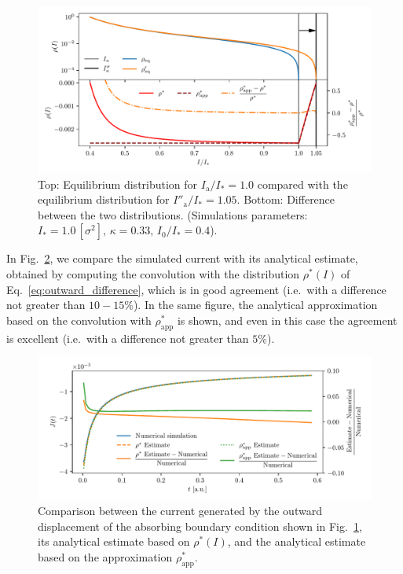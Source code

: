 {\begin{figure}[htp]
    \centering
    \includegraphics[width=\textwidth]{4_probing_the_diffusive_behavior/figs/final/difference_outwards_s.pdf}
    \caption{Top: Equilibrium distribution for $I_\mathrm{a}/I_\ast = 1.0$ compared with the equilibrium distribution for $I''_\mathrm{a}/I_\ast = 1.05$. Bottom: Difference between the two distributions. (Simulations parameters: $I_\ast = 1.0\,[\sigma^2],\, \kappa = 0.33,\, I_0/I_\ast = 0.4$).}
    \label{fig:6}
\end{figure}

In Fig.~\ref{fig:7}, we compare the simulated current with its analytical estimate, obtained by computing the convolution with the distribution $\rho^\ast(I)$ of Eq.~\eqref{eq:outward_difference}, which is in good agreement {(i.e.\ with a difference not greater than $10-15\%$)}. In the same figure, the analytical approximation based on the convolution with $\rho^\ast_\text{app}$ is shown, and even in this case the agreement is excellent {(i.e.\ with a difference not greater than $5\%$)}.

\begin{figure}[htp]
    \centering
    \includegraphics[width=\textwidth]{4_probing_the_diffusive_behavior/figs/final/current_outwards.pdf}
    \caption{Comparison between the current generated by the outward displacement of the absorbing boundary condition shown in Fig.~\ref{fig:6}, its analytical estimate based on $\rho^\ast(I)$, and the analytical estimate based on the approximation $\rho^\ast_\text{app}$.}
    \label{fig:7}
\end{figure}

}
